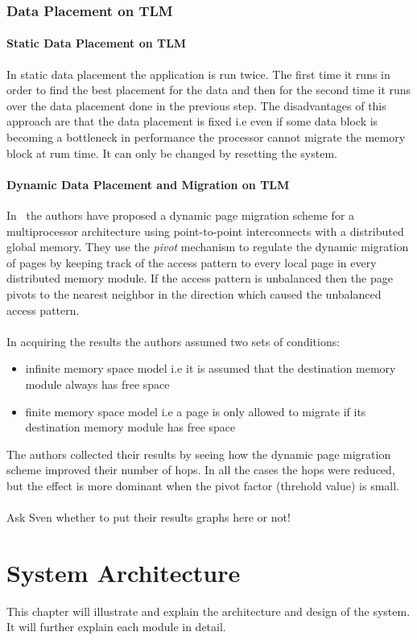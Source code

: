 \documentclass{listhesis}
\begin{document}
\subsection{Data Placement on TLM}
\subsubsection{Static Data Placement on TLM}
In static data placement the application is run twice. The first time it runs in order to find the best placement for the data and then for the second time it runs over the data placement done in the previous step. The disadvantages of this approach are that the data placement is fixed i.e even if some data block is becoming a bottleneck in performance the processor cannot migrate the memory block at rum time. It can only be changed by resetting the system. 
\subsubsection{Dynamic Data Placement and Migration on TLM}
In~\cite{dynamicPageMigration} the authors have proposed a dynamic page migration scheme for a multiprocessor architecture using point-to-point interconnects with a distributed global memory. They use the \textit{pivot} mechanism to regulate the dynamic migration of pages by keeping track of the access pattern to every local page in every distributed memory module. If the access pattern is unbalanced then the page pivots to the nearest neighbor in the direction which caused the unbalanced access pattern.\\
\\
In acquiring the results the authors assumed two sets of conditions:
\begin{itemize}
	\item infinite memory space model i.e it is assumed that the destination memory module always has free space
	\item finite memory space model i.e a page is only allowed to migrate if its destination memory module has free space
\end{itemize}
The authors collected their results by seeing how the dynamic page migration scheme improved their number of hops. In all the cases the hops were reduced, but the effect is more dominant when the pivot factor (threhold value) is small. \\
\\
Ask Sven whether to put their results graphs here or not!
\chapter{System Architecture}
This chapter will illustrate and explain the architecture and design of the system. It will further explain each module in detail.
\end{document}
